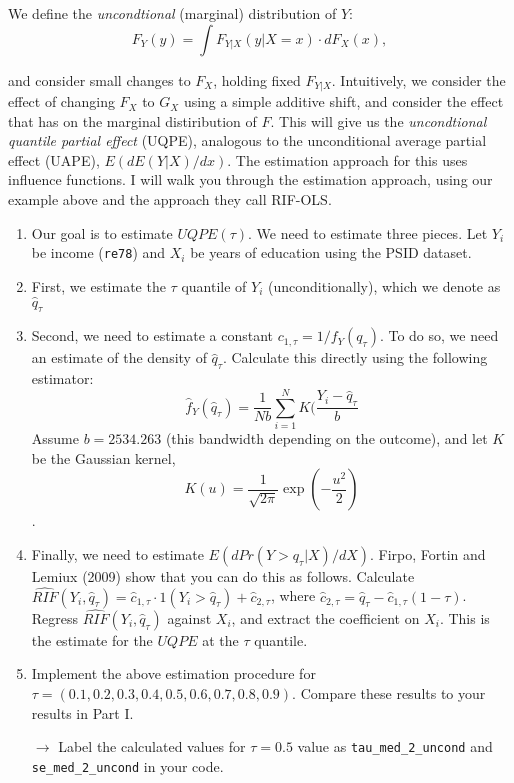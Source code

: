 \documentclass[11pt, a4paper]{article}
\begin{document}
\begin{enumerate}
  We define the \emph{uncondtional} (marginal) distribution of $Y$:
  $$ F_{Y}(y) = \int F_{Y|X}(y | X = x) \cdot dF_{X}(x),$$

  and consider small changes to $F_{X}$, holding fixed
  $F_{Y|X}$. Intuitively, we consider the effect of changing $F_{X}$
  to $G_{X}$ using a simple additive shift, and consider the effect
  that has on the marginal distiribution of $F$. This will give us the
  \emph{uncondtional quantile partial effect} (UQPE), analogous to the
  unconditional average partial effect (UAPE), $E(dE(Y|X)/dx)$. The
  estimation approach for this uses influence functions. I will walk
  you through the estimation approach, using our example above and the
  approach they call RIF-OLS.
  \begin{enumerate}
  \item Our goal is to estimate $UQPE(\tau)$. We need to estimate
    three pieces. Let $Y_{i}$ be income (\texttt{re78}) and $X_{i}$ be
    years of education using the PSID dataset.
  \item First, we estimate the $\tau$ quantile of
    $Y_{i}$ (unconditionally), which we denote as $\hat{q}_{\tau}$
  \item Second, we need to estimate a constant
    $c_{1,\tau} = 1/f_{Y}(q_\tau)$. To do so, we need an estimate of
    the density of $\hat{q}_{\tau}$. Calculate this directly using the
    following estimator:
    $$\hat{f}_{Y}(\hat{q}_{\tau}) = \frac{1}{Nb} \sum_{i = 1}^{N}K(\frac{Y_{i} - \hat{q}_{\tau}}{b}$$
    Assume $b = 2534.263$ (this bandwidth depending on the outcome),
    and let $K$ be the Gaussian kernel,
    $$K(u) = \frac{1}{\sqrt{2\pi}} \exp\left(-\frac{u^{2}}{2}\right)$$.
  \item Finally, we need to estimate $E(dPr(Y > q_{\tau} | X) /
    dX)$. Firpo, Fortin and Lemiux (2009) show that you can do this as
    follows. Calculate
    $\hat{RIF}(Y_{i}, \hat{q}_{\tau}) = \hat{c}_{1,\tau} \cdot 1(Y_{i}
    > \hat{q}_{\tau}) + \hat{c}_{2,\tau}$, where
    $\hat{c}_{2,\tau} = \hat{q}_{\tau} -
    \hat{c}_{1,\tau}(1-\tau)$. Regress
    $\hat{RIF}(Y_{i}, \hat{q}_{\tau})$ against $X_{i}$, and extract
    the coefficient on $X_{i}$. This is the estimate for the $UQPE$ at
    the $\tau$ quantile.
  \item Implement the above estimation procedure for
      $\tau = (0.1,0.2,0.3,0.4,0.5,0.6,0.7,0.8,0.9)$. Compare these results to your results in Part I.

      \hspace{10pt} $\rightarrow$ Label the calculated values for  $\tau=0.5$ value as \texttt{tau\_med\_2\_uncond} and \texttt{se\_med\_2\_uncond} in your code.


\end{enumerate}
\end{enumerate}
\end{document}
